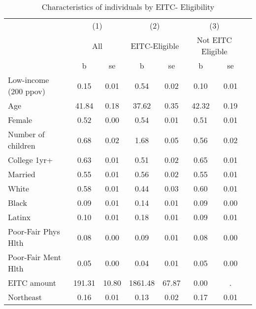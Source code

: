 \documentclass[smallcondensed,referee]{svjour3}
\begin{document}
\begin{table}[h!]
\centering
\begin{tabular}{l ccccccc}\caption{Characteristics of individuals by EITC- Eligibility}\label{Table1}
&&&& &&&\\
\hline
                    &\multicolumn{2}{c}{(1)}  &\multicolumn{2}{c}{(2)}  &\multicolumn{2}{c}{(3)}  \\
                    &\multicolumn{2}{c}{All}  &\multicolumn{2}{c}{EITC-Eligible}&\multicolumn{2}{c}{Not EITC Eligible}\\
                    &           b&          se&           b&          se&           b&          se\\
\hline
Low-income (200 ppov)&        0.15&        0.01&        0.54&        0.02&        0.10&        0.01\\
Age                 &       41.84&        0.18&       37.62&        0.35&       42.32&        0.19\\
Female              &        0.52&        0.00&        0.54&        0.01&        0.51&        0.01\\
Number of children  &        0.68&        0.02&        1.68&        0.05&        0.56&        0.02\\
College 1yr+        &        0.63&        0.01&        0.51&        0.02&        0.65&        0.01\\
Married             &        0.55&        0.01&        0.56&        0.02&        0.55&        0.01\\
White               &        0.58&        0.01&        0.44&        0.03&        0.60&        0.01\\
Black               &        0.09&        0.01&        0.14&        0.01&        0.09&        0.00\\
Latinx              &        0.10&        0.01&        0.18&        0.01&        0.09&        0.01\\
Poor-Fair Phys Hlth&        0.08&        0.00&        0.09&        0.01&        0.08&        0.00\\
Poor-Fair Ment Hlth &        0.05&        0.00&        0.04&        0.01&        0.05&        0.00\\
EITC amount         &      191.31&       10.80&     1861.48&       67.87&        0.00&           .\\
Northeast           &        0.16&        0.01&        0.13&        0.02&        0.17&        0.01\\

\end{tabular}
\end{table}
\end{document}
